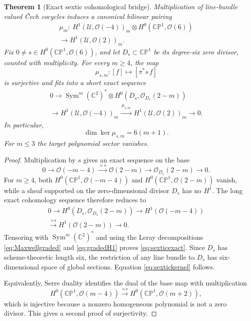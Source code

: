 \documentclass[aps,prd,reprint,nofootinbib,superscriptaddress]{revtex4-2}
\newtheorem{theorem}{Theorem}[section]
\theoremstyle{definition}
\theoremstyle{remark}
\newcommand{\C}{\mathbb{C}}
\newcommand{\CP}{\mathbb{CP}}
\newcommand{\cO}{\mathcal{O}}
\newcommand{\cU}{\mathcal{U}}
\newcommand{\Sym}{\operatorname{Sym}}
\begin{document}
\begin{theorem}[Exact sextic cohomological bridge]
\label{thm:sexticbridge}
Multiplication of line-bundle valued \v{C}ech cocycles induces a canonical bilinear pairing
\begin{multline}
\mu_m:\ H^1(\cU,\cO(-4))_m\otimes
H^0(\CP^1,\cO(6))\\
\longrightarrow H^1(\cU,\cO(2))_m.
\label{eq:universalmu}
\end{multline}
Fix $0\ne s\in H^0(\CP^1,\cO(6))$, and let $D_s\subset\CP^1$ be its degree-six zero divisor, counted with multiplicity.  For every $m\ge4$, the map
\begin{equation}
\mu_{s,m}:[f]\longmapsto[\pi^*s\,f]
\label{eq:musm}
\end{equation}
is surjective and fits into a short exact sequence
\begin{multline}
0\longrightarrow
\Sym^m(\C^2)^*\otimes
H^0\!\left(D_s,\cO_{D_s}(2-m)\right)\\
\longrightarrow H^1(\cU,\cO(-4))_m
\xrightarrow{\ \mu_{s,m}\ }
H^1(\cU,\cO(2))_m
\longrightarrow0.
\label{eq:sexticexact}
\end{multline}
In particular,
\begin{equation}
\dim\ker\mu_{s,m}=6(m+1).
\label{eq:sextickernel}
\end{equation}
For $m\le3$ the target polynomial sector vanishes.
\end{theorem}

\begin{proof}
Multiplication by $s$ gives an exact sequence on the base
\begin{equation}
0\to\cO(-m-4)\xrightarrow{\,\times s\,}\cO(2-m)
\to\cO_{D_s}(2-m)\to0.
\label{eq:basesequence}
\end{equation}
For $m\ge4$, both $H^0(\CP^1,\cO(-m-4))$ and $H^0(\CP^1,\cO(2-m))$ vanish, while a sheaf supported on the zero-dimensional divisor $D_s$ has no $H^1$.  The long exact cohomology sequence therefore reduces to
\begin{multline}
0\longrightarrow H^0(D_s,\cO_{D_s}(2-m))
\longrightarrow H^1(\cO(-m-4))\\
\xrightarrow{\times s}H^1(\cO(2-m))\longrightarrow0.
\label{eq:baseexactH1}
\end{multline}
Tensoring with $\Sym^m(\C^2)^*$ and using the Leray decompositions \eqref{eq:Maxwellgraded} and \eqref{eq:gradedH1} proves \eqref{eq:sexticexact}.  Since $D_s$ has scheme-theoretic length six, the restriction of any line bundle to $D_s$ has six-dimensional space of global sections.  Equation \eqref{eq:sextickernel} follows.

Equivalently, Serre duality identifies the dual of the base map with multiplication
\[
H^0(\CP^1,\cO(m-4))\xrightarrow{\times s}
H^0(\CP^1,\cO(m+2)),
\]
which is injective because a nonzero homogeneous polynomial is not a zero divisor.  This gives a second proof of surjectivity.
\end{proof}
\end{document}
